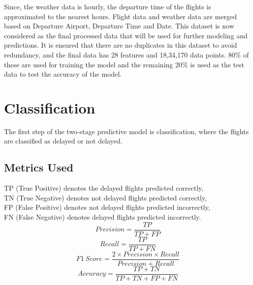 \documentclass[12pt]{article}
\begin{document}
Since, the weather data is hourly, the departure time of the flights is approximated to the nearest hours. Flight data and weather data are merged based on Departure Airport, Departure Time and Date. This dataset is now considered as the final processed data that will be used for further modeling and predictions. It is ensured that there are no duplicates in this dataset to avoid redundancy, and the final data has 28 features and 18,34,170 data points. 80\% of these are used for training the model and the remaining 20\% is used as the test data to test the accuracy of the model.

\section{Classification}
The first step of the two-stage predictive model is classification, where the flights are  classified as delayed or not delayed.
\subsection{Metrics Used}
 TP (True Positive) denotes the delayed flights predicted correctly,\\
    TN (True Negative) denotes not delayed flights predicted correctly,\\
    FP (False Positive) denotes not delayed flights predicted incorrectly,\\
    FN (False Negative) denotes delayed flights predicted incorrectly.\\
$$Precision = \frac{TP}{TP+FP}$$
$$Recall = \frac{TP}{TP+FN}$$
$$F1\ Score =  \frac{2\times Precision\times Recall}{Precision+Recall}$$
$$Accuracy =\frac{TP+TN}{TP+TN+FP+FN}$$
\end{document}
